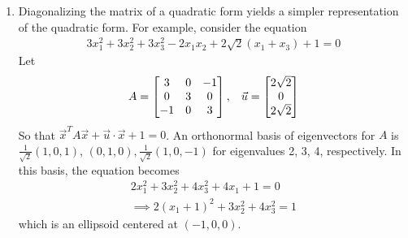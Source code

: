 \documentclass[10pt]{article}
\begin{document}
\begin{multicols*}{2}
\begin{enumerate}
\begin{enumerate}
        \item Diagonalizing the matrix of a quadratic form yields a simpler representation of the quadratic form. For example, consider the equation
        \begin{align*}
            3x_1^2 + 3x_2^2+3x_3^2-2x_1x_2+2\sqrt{2}(x_1 + x_3) + 1 = 0
        \end{align*}
        Let 
        \begin{align*}
            A = 
            \begin{bmatrix}
            3 & 0 & -1 \\
            0 & 3 & 0 \\
            -1 & 0 & 3
            \end{bmatrix}, \hspace{3mm}
            \vec{u} = 
            \begin{bmatrix} 
            2\sqrt{2} \\ 0 \\ 2\sqrt{2}
            \end{bmatrix}
        \end{align*}
        So that $\vec{x}^TA\vec{x} + \vec{u} \cdot \vec{x} + 1 = 0$. An orthonormal basis of eigenvectors for $A$ is $\frac{1}{\sqrt{2}} (1,0,1)$, $(0,1,0), \frac{1}{\sqrt{2}} (1,0,-1)$ for eigenvalues 2, 3, 4, respectively. In this basis, the equation becomes 
        \begin{align*}
            2x_1^2 +3x_2^2 +4x_3^2 +4x_1 +1 = 0 \\
            \implies 2(x_1 + 1)^2 + 3x_2^2 + 4x_3^2 = 1
        \end{align*}
        which is an ellipsoid centered at $(-1,0,0)$.
    \end{enumerate} 

    
    
\end{enumerate}
\end{multicols*}
\end{document}
